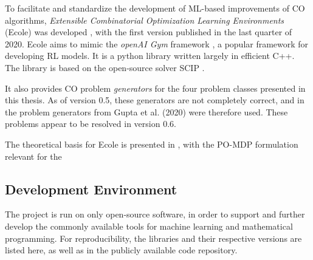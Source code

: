 To facilitate and standardize the development of \gls{ML}-based improvements of \gls{CO} algorithms, \textit{Extensible Combinatorial Optimization Learning Environments} (\gls{Ecole}) was developed \cite{prouvost2020ecole}, with the first version published in the last quarter of 2020. \gls{Ecole} aims to mimic the \textit{openAI Gym} framework \cite{brockman2016openai}, a popular framework for developing \gls{RL} models. It is a python library written largely in efficient C++. 
The library is based on the open-source solver \gls{SCIP} \cite{achterberg2009scip}.


It also provides \gls{CO} problem \textit{generators} for the four problem classes presented in this thesis. As of version 0.5, these generators are not completely correct, and in the problem generators from Gupta et al. (2020) \cite{gupta2020hybrid} were therefore used. These problems appear to be resolved in version 0.6.  


The theoretical basis for \gls{Ecole} is presented in , with the \gls{PO-MDP} formulation relevant for the  





\subsection{Development Environment}

The project is run on only open-source software, in order to support and further develop the commonly available tools for machine learning and mathematical programming. For reproducibility, the libraries and their respective versions are listed here, as well as in the publicly available code repository. 

